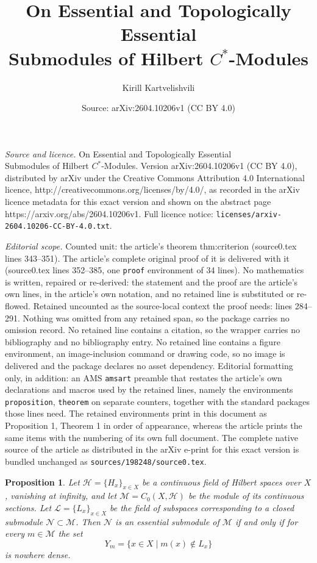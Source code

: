 \documentclass[10pt,a4paper]{amsart}
\title{On Essential and Topologically Essential \\ Submodules of Hilbert $C^*$-Modules}
\author{Kirill Kartvelishvili}
\date{Source: arXiv:2604.10206v1 (CC BY 4.0)}
\newtheorem{proposition}{Proposition}
\newcommand{\M}{\mathcal M}
\newcommand{\N}{\mathcal N}
\begin{document}
\maketitle

\noindent\emph{Source and licence.} On Essential and Topologically Essential \\ Submodules of Hilbert $C^*$-Modules. Version arXiv:2604.10206v1 (CC BY 4.0), distributed by arXiv under the Creative Commons Attribution 4.0 International licence, http://creativecommons.org/licenses/by/4.0/, as recorded in the arXiv licence metadata for this exact version and shown on the abstract page https://arxiv.org/abs/2604.10206v1. Full licence notice: \texttt{licenses/arxiv-2604.10206-CC-BY-4.0.txt}.\par\smallskip

\noindent\textit{Editorial scope.} Counted unit: the article's theorem thm:criterion (source0.tex lines 343--351). The article's complete original proof of it is delivered with it (source0.tex lines 352--385, one \texttt{proof} environment of 34 lines). No mathematics is written, repaired or re-derived: the statement and the proof are the article's own lines, in the article's own notation, and no retained line is substituted or re-flowed.  Retained uncounted as the source-local context the proof needs: lines 284--291.  Nothing was omitted from any retained span, so the package carries no omission record.  No retained line contains a citation, so the wrapper carries no bibliography and no bibliography entry.  No retained line contains a figure environment, an image-inclusion command or drawing code, so no image is delivered and the package declares no asset dependency.  Editorial formatting only, in addition: an AMS \texttt{amsart} preamble that restates the article's own declarations and macros used by the retained lines, namely the environments \texttt{proposition}, \texttt{theorem} on separate counters, together with the standard packages those lines need.  The retained environments print in this document as Proposition 1, Theorem 1 in order of appearance, whereas the article prints the same items with the numbering of its own full document.  The complete native source of the article as distributed in the arXiv e-print for this exact version is bundled unchanged as \texttt{sources/198248/source0.tex}.
	\begin{proposition}
		\label{prop:criterion}
		Let $\mathcal H = \{H_x\}_{x \in X}$ be a continuous field of Hilbert spaces over $X$, vanishing at infinity, and let $\M = C_0(X, \mathcal H)$ be the module of its continuous sections.
		Let $\mathcal L = \{L_x\}_{x \in X}$ be the field of subspaces corresponding to a closed submodule $\N \subset \M$.
		Then $\N$ is an essential submodule of $\M$ if and only if for every $m \in \M$ the set
		\[ Y_m = \{ x \in X \mid m(x) \notin L_x \} \]
		is nowhere dense.
	\end{proposition}
\end{document}
